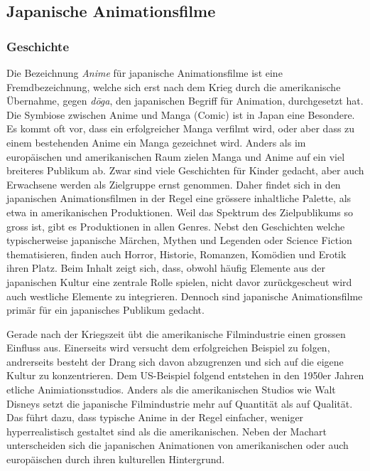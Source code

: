 \subsection{Japanische Animationsfilme}
\subsubsection{Geschichte}
Die Bezeichnung \emph{Anime} für japanische Animationsfilme ist eine Fremdbezeichnung, welche sich erst nach dem Krieg durch die amerikanische Übernahme, gegen \emph{d\={o}ga}, den japanischen Begriff für Animation, durchgesetzt hat. Die Symbiose zwischen Anime und Manga (Comic) ist in Japan eine Besondere. Es kommt oft vor, dass ein erfolgreicher Manga verfilmt wird, oder aber dass zu einem bestehenden Anime ein Manga gezeichnet wird. 
Anders als im europäischen und amerikanischen Raum zielen Manga und Anime auf ein viel breiteres Publikum ab. Zwar sind viele Geschichten für Kinder gedacht, aber auch Erwachsene werden als Zielgruppe ernst genommen. Daher findet sich in den japanischen Animationsfilmen in der Regel eine grössere inhaltliche Palette, als etwa in amerikanischen Produktionen. Weil das Spektrum des Zielpublikums so gross ist, gibt es Produktionen in allen Genres. Nebst den Geschichten welche typischerweise japanische Märchen, Mythen und Legenden oder Science Fiction thematisieren, finden auch Horror, Historie, Romanzen, Komödien und Erotik ihren Platz. Beim Inhalt zeigt sich, dass, obwohl häufig Elemente aus der japanischen Kultur eine zentrale Rolle spielen, nicht davor zurückgescheut wird auch westliche Elemente zu integrieren. Dennoch sind japanische Animationsfilme primär für ein japanisches Publikum gedacht. 

Gerade nach der Kriegszeit übt die amerikanische Filmindustrie einen grossen Einfluss aus. Einerseits wird versucht dem erfolgreichen Beispiel zu folgen, andrerseits besteht der Drang sich davon abzugrenzen und sich auf die eigene Kultur zu konzentrieren. Dem US-Beispiel folgend entstehen in den 1950er Jahren etliche Animiationsstudios. Anders als die amerikanischen Studios wie Walt Disneys setzt die japanische Filmindustrie mehr auf Quantität als auf Qualität. Das führt dazu, dass typische Anime in der Regel einfacher, weniger hyperrealistisch gestaltet sind als die amerikanischen. Neben der Machart unterscheiden sich die japanischen Animationen von amerikanischen oder auch europäischen durch ihren kulturellen Hintergrund. 

